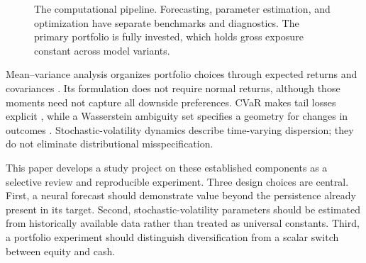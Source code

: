 \begin{figure}[t]
\centering
{}
\caption{The computational pipeline. Forecasting, parameter estimation, and optimization have separate benchmarks and diagnostics. The primary portfolio is fully invested, which holds gross exposure constant across model variants.}
\label{fig:pipeline}
\end{figure}

Mean--variance analysis organizes portfolio choices through expected returns and covariances \cite{markowitz}. Its formulation does not require normal returns, although those moments need not capture all downside preferences. CVaR makes tail losses explicit \cite{rockafellar}, while a Wasserstein ambiguity set specifies a geometry for changes in outcomes \cite{esfahani}. Stochastic-volatility dynamics describe time-varying dispersion; they do not eliminate distributional misspecification.

This paper develops a study project on these established components as a selective review and reproducible experiment. Three design choices are central. First, a neural forecast should demonstrate value beyond the persistence already present in its target. Second, stochastic-volatility parameters should be estimated from historically available data rather than treated as universal constants. Third, a portfolio experiment should distinguish diversification from a scalar switch between equity and cash.

